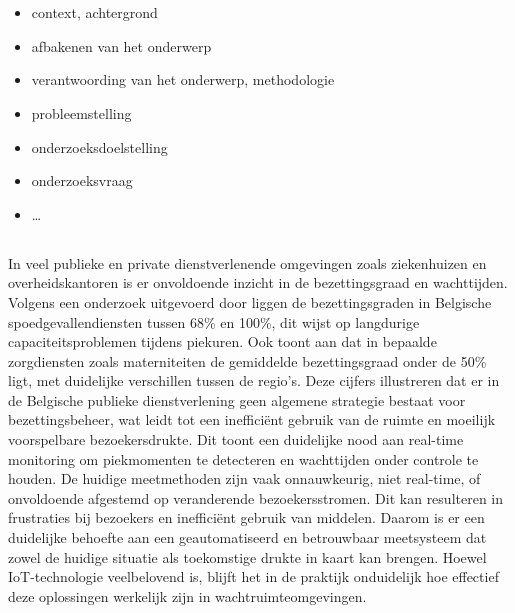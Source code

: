 
\chapter{}%
\label{ch:inleiding}


\begin{itemize}
  \item context, achtergrond
  \item afbakenen van het onderwerp
  \item verantwoording van het onderwerp, methodologie
  \item probleemstelling
  \item onderzoeksdoelstelling
  \item onderzoeksvraag
  \item \ldots
\end{itemize}

\section{}%
In veel publieke en private dienstverlenende omgevingen zoals ziekenhuizen en overheidskantoren is er onvoldoende inzicht in de bezettingsgraad en wachttijden. Volgens een onderzoek uitgevoerd door \autocite{Jobe2018} liggen de bezettingsgraden in Belgische spoedgevallendiensten tussen 68\% en 100\%, dit wijst op langdurige capaciteitsproblemen tijdens piekuren. Ook \autocite{Lefevre2019} toont aan dat in bepaalde zorgdiensten zoals materniteiten de gemiddelde bezettingsgraad onder de 50\% ligt, met duidelijke verschillen tussen de regio's. Deze cijfers illustreren dat er in de Belgische publieke dienstverlening geen algemene strategie bestaat voor bezettingsbeheer, wat leidt tot een inefficiënt gebruik van de ruimte en moeilijk voorspelbare bezoekersdrukte. Dit toont een duidelijke nood aan real-time monitoring om piekmomenten te detecteren en wachttijden onder controle te houden. De huidige meetmethoden zijn vaak onnauwkeurig, niet real-time, of onvoldoende afgestemd op veranderende bezoekersstromen. Dit kan resulteren in frustraties bij bezoekers en inefficiënt gebruik van middelen. Daarom is er een duidelijke behoefte aan een geautomatiseerd en betrouwbaar meetsysteem dat zowel de huidige situatie als toekomstige drukte in kaart kan brengen. Hoewel IoT-technologie veelbelovend is, blijft het in de praktijk onduidelijk hoe effectief deze oplossingen werkelijk zijn in wachtruimteomgevingen. \DONE


